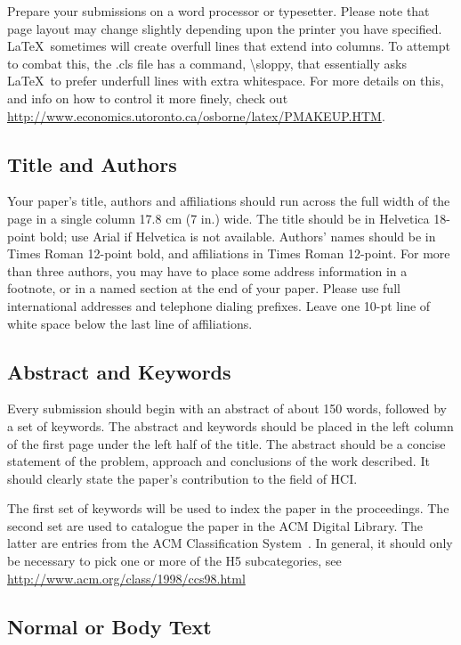 \documentclass{sigchi}
\begin{document}
Prepare your submissions on a word processor or typesetter.  Please
note that page layout may change slightly depending upon the printer
you have specified.  \LaTeX\ sometimes will create overfull lines
that extend into columns.  To attempt to combat this, the .cls
file has a command, {\textbackslash}sloppy, that essentially asks
\LaTeX\ to prefer underfull lines with extra whitespace.  For more
details on this, and info on how to control it more finely, check out
{\url{http://www.economics.utoronto.ca/osborne/latex/PMAKEUP.HTM}}.

\subsection{Title and Authors}

Your paper's title, authors and affiliations should run across the
full width of the page in a single column 17.8 cm (7 in.) wide.  The
title should be in Helvetica 18-point bold; use Arial if Helvetica is
not available.  Authors' names should be in Times Roman 12-point bold,
and affiliations in Times Roman 12-point.  For more than three authors,
you may have to place some address information in a footnote, or in a named
section at the end of your paper. Please use full international addresses and
telephone dialing prefixes.  Leave one 10-pt line of white space below the last
line of affiliations.

\subsection{Abstract and Keywords}

Every submission should begin with an abstract of about 150 words,
followed by a set of keywords. The abstract and keywords should be
placed in the left column of the first page under the left half of the
title. The abstract should be a concise statement of the problem,
approach and conclusions of the work described.  It should clearly
state the paper's contribution to the field of HCI.

The first set of keywords will be used to index the paper in the
proceedings. The second set are used to catalogue the paper in the ACM
Digital Library. The latter are entries from the ACM Classification
System~\cite{acm_categories}.  In general, it should only be necessary
to pick one or more of the H5 subcategories, see
\url{http://www.acm.org/class/1998/ccs98.html}

\subsection{Normal or Body Text}
\end{document}
